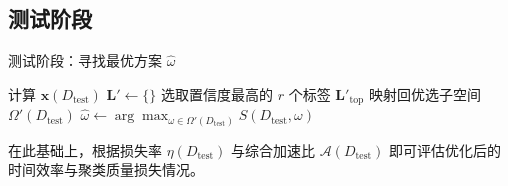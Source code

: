\documentclass[8pt,twocolumn]{article} %
\numberwithin{equation}{section}
\begin{document}
\subsection{测试阶段}
\begin{algorithm}[ht]
\caption{测试阶段：寻找最优方案 \(\hat{\omega}\)}
\label{alg:test-phase}

计算 $\mathbf{x}(D_{\text{test}})$\;
$\mathbf{L}' \leftarrow \{\}$\;
选取置信度最高的 $r$ 个标签 $\mathbf{L}'_{\mathrm{top}}$\;
映射回优选子空间 $\Omega'(D_{\text{test}})$\;
$\hat{\omega} \leftarrow \arg\max_{\omega \in \Omega'(D_{\text{test}})}S(D_{\text{test}}, \omega)$\;
\KwRet{$\hat{\omega}$}
\end{algorithm}

在此基础上，根据损失率 \(\eta(D_{\text{test}})\) 与综合加速比 \(\mathcal{A}(D_{\text{test}})\) 即可评估优化后的时间效率与聚类质量损失情况。

%
%
\end{document}

